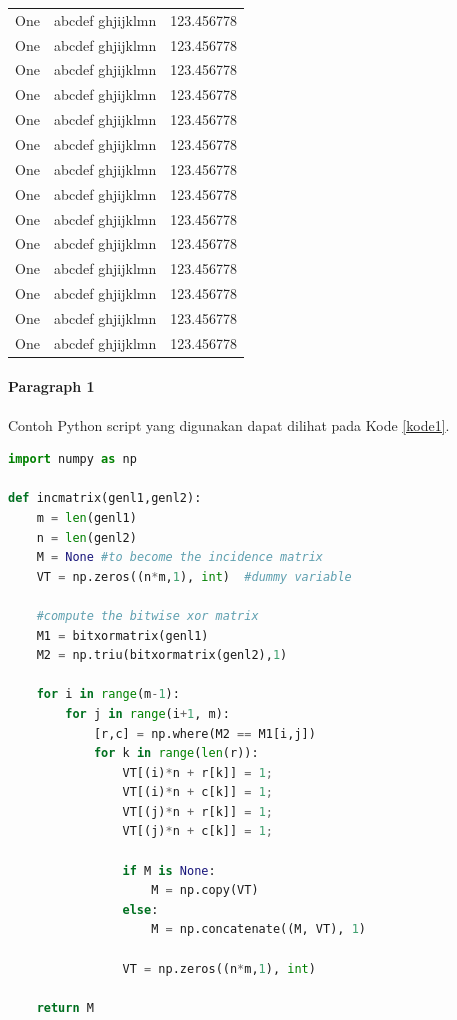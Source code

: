 \begin{center}
\begin{longtable}{|l|l|l|}
One & abcdef ghjijklmn & 123.456778 \\
One & abcdef ghjijklmn & 123.456778 \\
One & abcdef ghjijklmn & 123.456778 \\
One & abcdef ghjijklmn & 123.456778 \\
One & abcdef ghjijklmn & 123.456778 \\
One & abcdef ghjijklmn & 123.456778 \\
One & abcdef ghjijklmn & 123.456778 \\
One & abcdef ghjijklmn & 123.456778 \\
One & abcdef ghjijklmn & 123.456778 \\
One & abcdef ghjijklmn & 123.456778 \\
One & abcdef ghjijklmn & 123.456778 \\
One & abcdef ghjijklmn & 123.456778 \\
One & abcdef ghjijklmn & 123.456778 \\
One & abcdef ghjijklmn & 123.456778 \\
\end{longtable}
\end{center}


\paragraph{Paragraph 1}

\lipsum[15-16]

Contoh Python script yang digunakan dapat dilihat pada Kode \ref{kode1}.

{\footnotesize
\begin{lstlisting}[basicstyle=\linespread{0.8},language=Python, caption= Contoh potongan kode, label= kode1]
import numpy as np
    
def incmatrix(genl1,genl2):
    m = len(genl1)
    n = len(genl2)
    M = None #to become the incidence matrix
    VT = np.zeros((n*m,1), int)  #dummy variable
    
    #compute the bitwise xor matrix
    M1 = bitxormatrix(genl1)
    M2 = np.triu(bitxormatrix(genl2),1) 

    for i in range(m-1):
        for j in range(i+1, m):
            [r,c] = np.where(M2 == M1[i,j])
            for k in range(len(r)):
                VT[(i)*n + r[k]] = 1;
                VT[(i)*n + c[k]] = 1;
                VT[(j)*n + r[k]] = 1;
                VT[(j)*n + c[k]] = 1;
                
                if M is None:
                    M = np.copy(VT)
                else:
                    M = np.concatenate((M, VT), 1)
                
                VT = np.zeros((n*m,1), int)
    
    return M
\end{lstlisting}
}

